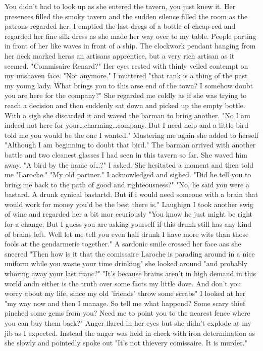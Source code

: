 You didn't had to look up as she entered the tavern, you just knew it. Her presences filled the smoky tavern and the sudden silence filled the room as the patrons regarded her. I emptied the last dregs of a bottle of cheap red and regarded her fine silk dress as she made her way over to my table. People parting in front of her like waves in front of a ship. The clockwork pendant hanging from her neck marked heras an artisans apprentice, but a very rich artisan as it seemed. "Commisaire Renard?" Her eyes rested with thinly veiled contempt on my unshaven face. "Not anymore." I muttered "that rank is a thing of the past my young lady. What brings you to this arse end of the town? I somehow doubt you are here for the company?" She regarded me coldly as if she was trying to reach a decision and then suddenly sat down and picked up the empty bottle. With a sigh she discarded it and waved the barman to bring another. "No I am indeed not here for your\dots charming\dots company. But I need help and a little bird told me you would be the one I wanted." Mustering me again she added to herself "Although I am beginning to doubt that bird." The barman arrived with another battle and two cleanest glasses I had seen in this tavern so far. She waved him away. "A bird by the name of\dots?" I asked. She hesitated a moment and then told me "Laroche." "My old partner." I acknowledged and sighed. "Did he tell you to bring me back to the path of good and righteousness?" "No, he said you were a bastard. A drunk cynical bastartd. But if i would need someone with a brain that would work for money you'd be the best there is." Laughign I took another swig of wine and regarded her a bit mor ecuriously "You know he just might be right for a change. But I guess you are asking yourself if this drunk still has any kind of brains left. Well let me tell you even half drunk I have more wits than those fools at the gendarmerie together." A sardonic smile crossed her face aas she sneered "Then how is it that the comissaire Laroche is parading around in a nice uniform while you waste your time drinking" she looked around "and probably whoring away your last franc?" "It's because brains aren't in high demand in this world andn either is the truth over some facts my little dove.  And don't you worry about my life, since my old 'friends' throw some scrabs" I looked at her "my way now and then I manage. So tell me what happend? Some scary thief pinched some gems from you? Need me to point you to the nearest fence where you can buy them back?" Anger flared in her eyes but she didn't explode at my jib as I expected. Instead the anger was held in check with iron determination as she slowly and pointedly spoke out "It's not thievery comissaire. It is murder."

